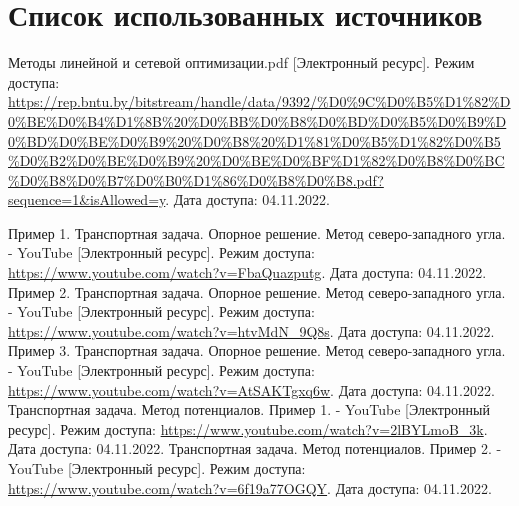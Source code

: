 \newpage

\begingroup
  \section*{Список использованных источников}

  \renewcommand{\addcontentsline}[3]{}%
  \renewcommand{\section}[2]{}%

  \begin{thebibliography}{}
    Методы линейной и сетевой оптимизации.pdf
    [Электронный ресурс].
    Режим доступа: \url{https://rep.bntu.by/bitstream/handle/data/9392/%D0%9C%D0%B5%D1%82%D0%BE%D0%B4%D1%8B%20%D0%BB%D0%B8%D0%BD%D0%B5%D0%B9%D0%BD%D0%BE%D0%B9%20%D0%B8%20%D1%81%D0%B5%D1%82%D0%B5%D0%B2%D0%BE%D0%B9%20%D0%BE%D0%BF%D1%82%D0%B8%D0%BC%D0%B8%D0%B7%D0%B0%D1%86%D0%B8%D0%B8.pdf?sequence=1&isAllowed=y}.
    Дата доступа: 04.11.2022.

    Пример 1. Транспортная задача. Опорное решение. Метод северо-западного угла. - YouTube
    [Электронный ресурс].
    Режим доступа: \url{https://www.youtube.com/watch?v=FbaQuazputg}.
    Дата доступа: 04.11.2022.
    Пример 2. Транспортная задача. Опорное решение. Метод северо-западного угла. - YouTube
    [Электронный ресурс].
    Режим доступа: \url{https://www.youtube.com/watch?v=htvMdN_9Q8s}.
    Дата доступа: 04.11.2022.
    Пример 3. Транспортная задача. Опорное решение. Метод северо-западного угла. - YouTube
    [Электронный ресурс].
    Режим доступа: \url{https://www.youtube.com/watch?v=AtSAKTgxq6w}.
    Дата доступа: 04.11.2022.
    Транспортная задача. Метод потенциалов. Пример 1. - YouTube
    [Электронный ресурс].
    Режим доступа: \url{https://www.youtube.com/watch?v=2lBYLmoB_3k}.
    Дата доступа: 04.11.2022.
    Транспортная задача. Метод потенциалов. Пример 2. - YouTube
    [Электронный ресурс].
    Режим доступа: \url{https://www.youtube.com/watch?v=6f19a77OGQY}.
    Дата доступа: 04.11.2022.
  \end{thebibliography}
\endgroup

